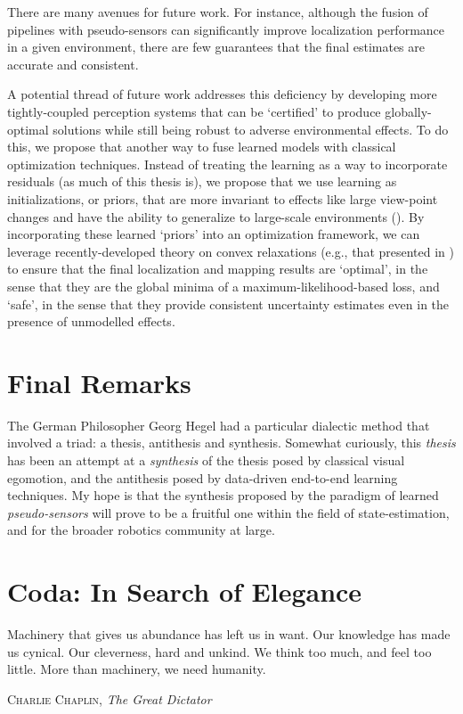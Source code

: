There are many avenues for future work. For instance, although the fusion of pipelines with pseudo-sensors can significantly improve localization performance in a given environment, there are few guarantees that the final estimates are accurate and consistent.

A potential thread of future work addresses this deficiency by developing more tightly-coupled perception systems that can be ‘certified’ to produce globally-optimal solutions while still being robust to adverse environmental effects. To do this, we propose that another way to fuse learned models with classical optimization techniques. Instead of treating the learning as a way to incorporate residuals (as much of this thesis is), we propose that we use learning as initializations, or priors, that are more invariant to effects like large view-point changes and have the ability to generalize to large-scale environments (). By incorporating these learned ‘priors’ into an optimization framework, we can leverage recently-developed theory on convex relaxations (e.g., that presented in \cite{Rosen2019-kk}) to ensure that the final localization and mapping results are ‘optimal’, in the sense that they are the global minima of a maximum-likelihood-based loss, and ‘safe’, in the sense that they provide consistent uncertainty estimates even in the presence of unmodelled effects. 

\section{Final Remarks}

The German Philosopher Georg Hegel had a particular dialectic method that involved a triad: a thesis, antithesis and synthesis.
Somewhat curiously, this \textit{thesis} has been an attempt at a \textit{synthesis} of the thesis posed by classical visual egomotion, and the antithesis posed by data-driven end-to-end learning techniques.
My hope is that the synthesis proposed by the paradigm of learned \textit{pseudo-sensors} will prove to be a fruitful one within the field of state-estimation, and for the broader robotics community at large. 

\section{Coda: In Search of Elegance}
\epigraph{Machinery that gives us abundance has left us in want.
Our knowledge has made us cynical.
Our cleverness, hard and unkind.
We think too much, and feel too little.
More than machinery, we need humanity.}{\textsc{Charlie Chaplin}, \textit{The Great Dictator}}

